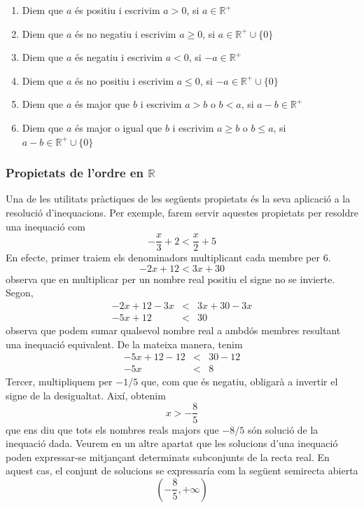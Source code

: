 \begin{enumerate}
\item Diem que $a$ és positiu i escrivim $a>0$, si $a\in \mathbb{R}%
^{+} $

\item Diem que $a$ és no negatiu i escrivim $a\geq 0$, si $a\in 
\mathbb{R}^{+}\cup \{0\}$

\item Diem que $a$ és negatiu i escrivim $a<0$, si $-a\in \mathbb{R}%
^{+}$

\item Diem que $a$ és no positiu i escrivim $a\leq 0$, si $-a\in 
\mathbb{R}^{+}\cup \{0\}$

\item Diem que $a$ és major que $b$ i escrivim $a>b$ o $b<a$, si $%
a-b\in \mathbb{R}^{+}$

\item Diem que $a$ és major o igual que $b$ i escrivim $a\geq b$ o $%
b\leq a$, si $a-b\in \mathbb{R}^{+}\cup \{0\}$
\end{enumerate}

\subsubsection{Propietats de l’ordre en $\mathbb{R}$}

Una de les utilitats pràctiques de les següents propietats és la seva
aplicació a la resolució d’inequacions. Per exemple, farem servir
aquestes propietats per resoldre una inequació com%
\begin{equation*}
-\frac{x}{3}+2<\frac{x}{2}+5
\end{equation*}%
En efecte, primer traiem els denominadors multiplicant cada membre per 
$6$. 
\begin{equation*}
-2x+12<3x+30
\end{equation*}%
observa que en multiplicar per un nombre real positiu el signe no se
invierte. Segon, 
\begin{align*}
-2x+12-3x &<&3x+30-3x \\
-5x+12 &<&30
\end{align*}%
observa que podem sumar qualsevol nombre real a ambdós membres
resultant una inequació equivalent. De la mateixa manera, tenim%
\begin{align*}
-5x+12-12 &<&30-12 \\
-5x &<&8
\end{align*}%
Tercer, multipliquem per $-1/5$ que, com que és negatiu, obligarà a
invertir el signe de la desigualtat. Així, obtenim%
\begin{equation*}
x>-\frac{8}{5}
\end{equation*}%
que ens diu que tots els nombres reals majors que $-8/5$ són solució de la inequació dada. Veurem en un altre apartat que les
solucions d’una inequació poden expressar-se mitjançant determinats
subconjunts de la recta real. En aquest cas, el conjunt de solucions se
expressaría com la següent semirecta abierta%
\begin{equation*}
\left( -\frac{8}{5},+\infty \right) 
\end{equation*}

